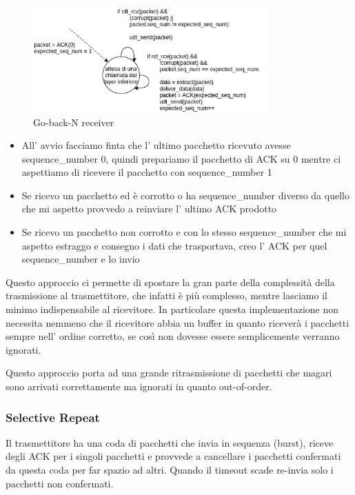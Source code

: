 \begin{figure}[H]
    \centering
    \includegraphics[width=340px]{images/3_Reti_connessione_diretta/go-back-n_receiver.png}
    \caption{Go-back-N receiver}
\end{figure}
\begin{itemize}
    \item All' avvio facciamo finta che l' ultimo pacchetto ricevuto avesse sequence\_number 0, quindi prepariamo il pacchetto di ACK su 0 mentre ci aspettiamo di ricevere il pacchetto con sequence\_number 1

    \item Se ricevo un pacchetto ed è corrotto o ha sequence\_number diverso da quello che mi aspetto provvedo a reinviare l' ultimo ACK prodotto
    
    \item Se ricevo un pacchetto non corrotto e con lo stesso sequence\_number che mi aspetto estraggo e consegno i dati che trasportava, creo l' ACK per quel sequence\_number e lo invio
\end{itemize}

Questo approccio ci permette di spostare la gran parte della complessità della trasmissione al trasmettitore, che infatti è più complesso, mentre lasciamo il minimo indispensabile al ricevitore.
In particolare questa implementazione non necessita nemmeno che il ricevitore abbia un buffer in quanto riceverà i pacchetti sempre nell' ordine corretto, se così non dovesse essere semplicemente verranno ignorati.

Questo approccio porta ad una grande ritrasmissione di pacchetti che magari sono arrivati correttamente ma ignorati in quanto out-of-order.


\subsubsection{Selective Repeat}
Il trasmettitore ha una coda di pacchetti che invia in sequenza (burst), riceve degli ACK per i singoli pacchetti e provvede a cancellare i pacchetti confermati da questa coda per far spazio ad altri.
Quando il timeout scade re-invia solo i pacchetti non confermati.

